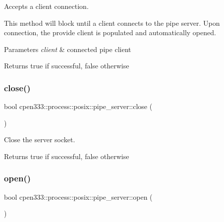 Accepts a client connection. 

This method will block until a client connects to the pipe server. Upon connection, the provide client is populated and automatically opened.


\begin{DoxyParams}{Parameters}
{\em client} & connected pipe client \\
\hline
\end{DoxyParams}
\begin{DoxyReturn}{Returns}
true if successful, false otherwise 
\end{DoxyReturn}
\mbox{\label{classcpen333_1_1process_1_1posix_1_1pipe__server_a3c13c11fb1ca6cecb65992d11b4fe56a}} 
\subsubsection{\texorpdfstring{close()}{close()}}
{\footnotesize\ttfamily bool cpen333\+::process\+::posix\+::pipe\+\_\+server\+::close (\begin{DoxyParamCaption}{ }\end{DoxyParamCaption})\hspace{0.3cm}{\ttfamily [inline]}}



Close the server socket. 

\begin{DoxyReturn}{Returns}
true if successful, false otherwise 
\end{DoxyReturn}
\mbox{\label{classcpen333_1_1process_1_1posix_1_1pipe__server_afcb8bad74a3f5540e2dba294a2bb1e5a}} 
\subsubsection{\texorpdfstring{open()}{open()}}
{\footnotesize\ttfamily bool cpen333\+::process\+::posix\+::pipe\+\_\+server\+::open (\begin{DoxyParamCaption}{ }\end{DoxyParamCaption})\hspace{0.3cm}{\ttfamily [inline]}}



